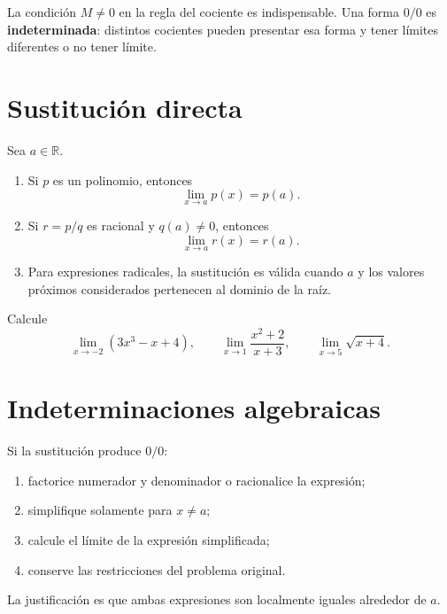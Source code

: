 \documentclass[10pt,a5paper]{article}
\newif\ifmostrarSoluciones
\begin{document}
\begin{nota}
La condición $M\neq0$ en la regla del cociente es indispensable. Una forma $0/0$ es \textbf{indeterminada}: distintos cocientes pueden presentar esa forma y tener límites diferentes o no tener límite.
\end{nota}

\section*{Sustitución directa}

\begin{proposicion}
Sea $a\in\mathbb{R}$.
\begin{enumerate}
  \item Si $p$ es un polinomio, entonces
  \[
    \lim_{x\to a}p(x)=p(a).
  \]
  \item Si $r=p/q$ es racional y $q(a)\neq0$, entonces
  \[
    \lim_{x\to a}r(x)=r(a).
  \]
  \item Para expresiones radicales, la sustitución es válida cuando $a$ y los valores próximos considerados pertenecen al dominio de la raíz.
\end{enumerate}
\end{proposicion}

\begin{ejemplo}
Calcule
\[
\lim_{x\to-2}(3x^3-x+4),\qquad
\lim_{x\to1}\frac{x^2+2}{x+3},\qquad
\lim_{x\to5}\sqrt{x+4}.
\]
\end{ejemplo}
\ifmostrarSoluciones
\begin{solucion}
Los denominadores y radicales son admisibles en los puntos indicados. Por sustitución,
\[
-18,\qquad \frac34,\qquad 3,
\]
respectivamente.
\end{solucion}
\else\vspace{15mm}\fi

\section*{Indeterminaciones algebraicas}

\begin{criterio}
Si la sustitución produce $0/0$:
\begin{enumerate}
  \item factorice numerador y denominador o racionalice la expresión;
  \item simplifique solamente para $x\neq a$;
  \item calcule el límite de la expresión simplificada;
  \item conserve las restricciones del problema original.
\end{enumerate}
La justificación es que ambas expresiones son localmente iguales alrededor de $a$.
\end{criterio}
\end{document}
